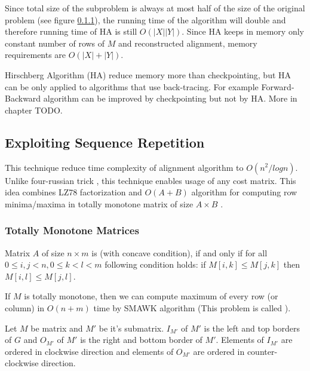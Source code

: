Since total size of the subproblem is always at most half of the size of the
original problem (see figure \ref{}), the running time of the algorithm will
double and therefore running time of HA is still $O(|X||Y|)$. Since HA keeps in
memory only constant number of rows of $M$ and reconstructed alignment, memory
requirements are $O(|X|+|Y|)$.

Hirschberg Algorithm (HA) reduce memory more than checkpointing, but HA can be
only applied to algorithms that use back-tracing. For example Forward-Backward
algorithm can be improved by checkpointing but not by HA. More in chapter TODO.

\subsection{Exploiting Sequence Repetition}

This technique reduce time complexity of alignment algorithm to $O(n^2/log n)$.
Unlike four-russian trick \cite{}, this technique enables usage of any cost
matrix.  This idea combines LZ78 factorization \cite{} and $O(A+B)$ algorithm
for computing row minima/maxima in totally monotone matrix of size $A\times
B$ \cite{Aggarwal1987}.

\subsubsection{Totally Monotone Matrices}

\begin{definition}\cite{Crochemore2002}
Matrix $A$ of size $n\times m$ is  (with concave condition),
if and only if for all $0\leq i,j< n, 0\leq k<l<m$ following condition holds:
if $M[i,k]\leq M[j,k]$ then $M[i,l]\leq M[j,l]$.
\end{definition}

If $M$ is totally monotone, then we can compute maximum of every row (or column)
in $O(n+m)$ time by SMAWK algorithm \cite{Aggarwal1987} (This problem is called
).

\begin{definition}\cite{Crochemore2002}
Let $M$ be matrix and $M'$ be it's
submatrix.  $I_{M'}$ of $M'$ is the left and top
borders of $G$ and  $O_{M'}$ of $M'$ is the right and
bottom border of $M'$. Elements of $I_{M'}$ are ordered in clockwise direction
and elements of $O_{M'}$ are ordered in counter-clockwise direction.
\end{definition}

